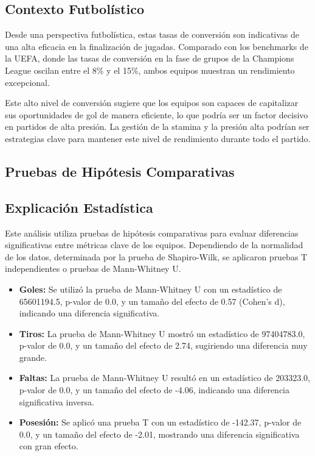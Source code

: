 \documentclass{article}
\begin{document}
    \subsection*{Contexto Futbolístico}
    Desde una perspectiva futbolística, estas tasas de conversión son indicativas de una alta eficacia en la finalización de jugadas. Comparado con los benchmarks de la UEFA, donde las tasas de conversión en la fase de grupos de la Champions League oscilan entre el 8\% y el 15\%, ambos equipos muestran un rendimiento excepcional.
    
    Este alto nivel de conversión sugiere que los equipos son capaces de capitalizar sus oportunidades de gol de manera eficiente, lo que podría ser un factor decisivo en partidos de alta presión. La gestión de la stamina y la presión alta podrían ser estrategias clave para mantener este nivel de rendimiento durante todo el partido.

    \subsection{Pruebas de Hipótesis Comparativas}
        \subsection*{Explicación Estadística}
        Este análisis utiliza pruebas de hipótesis comparativas para evaluar diferencias significativas entre métricas clave de los equipos. Dependiendo de la normalidad de los datos, determinada por la prueba de Shapiro-Wilk, se aplicaron pruebas T independientes o pruebas de Mann-Whitney U.
        
        \begin{itemize}
            \item \textbf{Goles:} Se utilizó la prueba de Mann-Whitney U con un estadístico de 65601194.5, p-valor de 0.0, y un tamaño del efecto de 0.57 (Cohen's d), indicando una diferencia significativa.
            \item \textbf{Tiros:} La prueba de Mann-Whitney U mostró un estadístico de 97404783.0, p-valor de 0.0, y un tamaño del efecto de 2.74, sugiriendo una diferencia muy grande.
            \item \textbf{Faltas:} La prueba de Mann-Whitney U resultó en un estadístico de 203323.0, p-valor de 0.0, y un tamaño del efecto de -4.06, indicando una diferencia significativa inversa.
            \item \textbf{Posesión:} Se aplicó una prueba T con un estadístico de -142.37, p-valor de 0.0, y un tamaño del efecto de -2.01, mostrando una diferencia significativa con gran efecto.
        \end{itemize}
        
\end{document}
